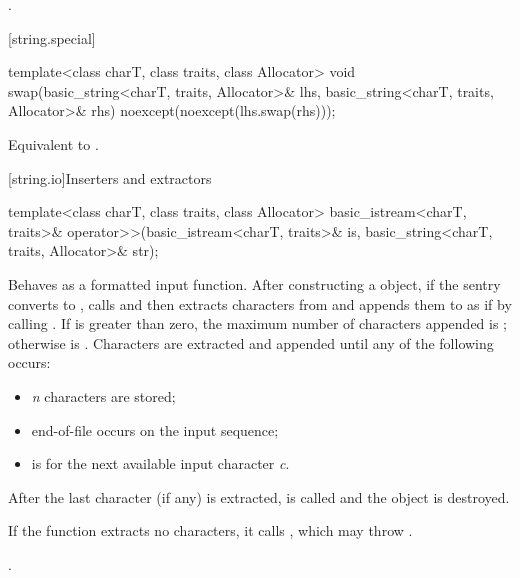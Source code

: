 \begin{itemdescr}
\pnum
\returns
{}.
\end{itemdescr}

[string.special]{}

%
\begin{itemdecl}
template<class charT, class traits, class Allocator>
  void swap(basic_string<charT, traits, Allocator>& lhs,
            basic_string<charT, traits, Allocator>& rhs)
    noexcept(noexcept(lhs.swap(rhs)));
\end{itemdecl}

\begin{itemdescr}
\pnum
\effects
Equivalent to .
\end{itemdescr}

[string.io]{Inserters and extractors}

%
\begin{itemdecl}
template<class charT, class traits, class Allocator>
  basic_istream<charT, traits>&
    operator>>(basic_istream<charT, traits>& is, basic_string<charT, traits, Allocator>& str);
\end{itemdecl}

\begin{itemdescr}
\pnum
\effects
Behaves as a formatted input function.
After constructing a
object, if the sentry converts to , calls
and then extracts characters from  and appends them
to  as if by calling
.
If
is greater than zero, the maximum
number  of characters appended is
;
otherwise  is
.
Characters are extracted and appended until any of the following
occurs:

\begin{itemize}
\item
\textit{n}
characters are stored;
\item
end-of-file occurs on the input sequence;
\item
{}
is  for the next available input character
\textit{c}.
\end{itemize}

\pnum
After the last character (if any) is extracted,
is called and the
object is destroyed.

\pnum
If the function extracts no characters, it calls
,
which may throw
.

\pnum
\returns
{}.
\end{itemdescr}

